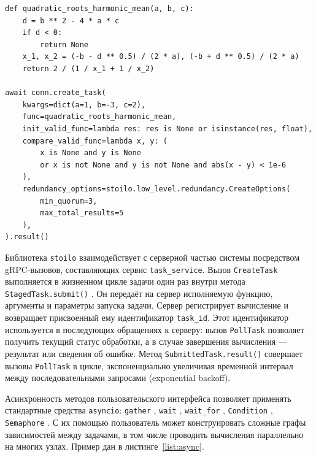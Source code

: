 \documentclass[a4paper,12pt]{extarticle}
\newcommand{\code}[1]{%
    \begingroup
    \setlength{\fboxsep}{1.2pt}%
    \colorbox{inlinecodebg}{\texttt{\textcolor{inlinecodefg}{#1}}}%
    \endgroup
}
\begin{document}
\begin{lstlisting}[caption={Пример настройки валидаторов и параметров репликации.}, label={list:validations}]
def quadratic_roots_harmonic_mean(a, b, c):
    d = b ** 2 - 4 * a * c
    if d < 0:
        return None
    x_1, x_2 = (-b - d ** 0.5) / (2 * a), (-b + d ** 0.5) / (2 * a)
    return 2 / (1 / x_1 + 1 / x_2)

await conn.create_task(
    kwargs=dict(a=1, b=-3, c=2),
    func=quadratic_roots_harmonic_mean,
    init_valid_func=lambda res: res is None or isinstance(res, float),
    compare_valid_func=lambda x, y: (
        x is None and y is None
        or x is not None and y is not None and abs(x - y) < 1e-6
    ),
    redundancy_options=stoilo.low_level.redundancy.CreateOptions(
        min_quorum=3,
        max_total_results=5
    ),
).result()
\end{lstlisting}

Библиотека \texttt{stoilo} взаимодействует с серверной частью системы посредством gRPC-вызовов, составляющих сервис \texttt{task\_service}.
Вызов \texttt{CreateTask} выполняется в жизненном цикле задачи один раз внутри метода \code{StagedTask.submit()}.
Он передаёт на сервер исполняемую функцию, аргументы и параметры запуска задачи.
Сервер регистрирует вычисление и возвращает присвоенный ему идентификатор \texttt{task\_id}.
Этот идентификатор используется в последующих обращениях к серверу: вызов \texttt{PollTask} позволяет получить текущий статус обработки, а в случае завершения вычисления — результат или сведения об ошибке.
Метод \code{SubmittedTask.result()} совершает вызовы \texttt{PollTask} в цикле, экспоненциально увеличивая временной интервал между последовательными запросами (exponential backoff).

Асинхронность методов пользовательского интерфейса позволяет применять стандартные средства \texttt{asyncio}: \code{gather}, \code{wait}, \code{wait\_for}, \code{Condition}, \code{Semaphore}.
С их помощью пользователь может конструировать сложные графы зависимостей между задачами, в том числе проводить вычисления параллельно на многих узлах.
Пример дан в листинге~\ref{list:async}.
\end{document}
